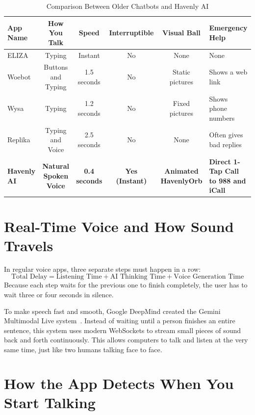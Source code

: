 \begin{table}[ht]
\centering
\caption{Comparison Between Older Chatbots and Havenly AI}
\label{tab:lit_comparison}
\begin{tabularx}{\textwidth}{lccccX}
\toprule
\textbf{App Name} & \textbf{How You Talk} & \textbf{Speed} & \textbf{Interruptible} & \textbf{Visual Ball} & \textbf{Emergency Help} \\
\midrule
ELIZA~\cite{weizenbaum1966eliza} & Typing & Instant & No & None & None \\
Woebot~\cite{fitzpatrick2017delivering} & Buttons and Typing & 1.5 seconds & No & Static pictures & Shows a web link \\
Wysa~\cite{inkster2018empathy} & Typing & 1.2 seconds & No & Fixed pictures & Shows phone numbers \\
Replika & Typing and Voice & 2.5 seconds & No & None & Often gives bad replies \\
\textbf{Havenly AI} & \textbf{Natural Spoken Voice} & \textbf{0.4 seconds} & \textbf{Yes (Instant)} & \textbf{Animated HavenlyOrb} & \textbf{Direct 1-Tap Call to 988 and iCall} \\
\bottomrule
\end{tabularx}
\end{table}

\section{Real-Time Voice and How Sound Travels}
\label{sec:lit_multimodal_live}

In regular voice apps, three separate steps must happen in a row:
\begin{equation}
\label{eq:old_voice_pipeline}
\text{Total Delay} = \text{Listening Time} + \text{AI Thinking Time} + \text{Voice Generation Time}
\end{equation}
Because each step waits for the previous one to finish completely, the user has to wait three or four seconds in silence. 

To make speech fast and smooth, Google DeepMind created the Gemini Multimodal Live system~\cite{google2024multimodallive}. Instead of waiting until a person finishes an entire sentence, this system uses modern WebSockets to stream small pieces of sound back and forth continuously. This allows computers to talk and listen at the very same time, just like two humans talking face to face.

\section{How the App Detects When You Start Talking}
\label{sec:lit_vad}

